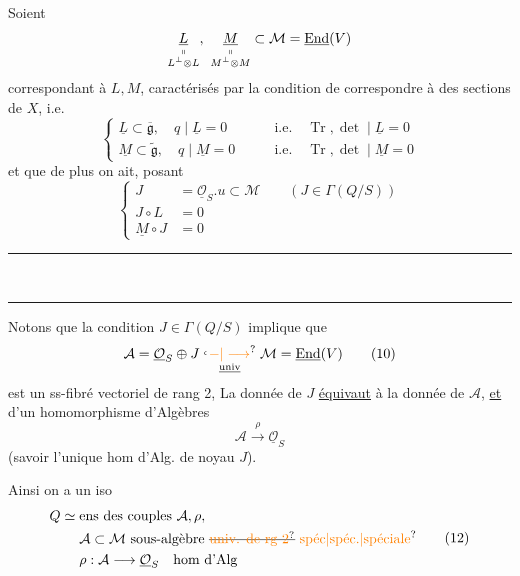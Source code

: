 Soient 
\[
 \underset{\substack{\shortparallel\\ L^\perp\otimes L}}{\underline L},\
 \underset{\substack{\shortparallel\\ M^\perp\otimes M}}{\underline M}
 \subset\mathcal M=\underline{\operatorname{End}}(V)
\]
correspondant à $L,M$,   caractérisés par la condition de correspondre à des sections de $X$, i.e.
\[
 \left\{\begin{aligned}
 \underline L\subset\overline{\mathfrak g},\quad
 q\mid\underline L=0&\qquad\text{i.e.}\quad\operatorname{Tr},\det\mid\underline L=0\\
 \underline M\subset\widetilde{\mathfrak g},\quad
 q\mid\underline M=0&\qquad\text{i.e.}\quad\operatorname{Tr},\det\mid\underline M=0
 \end{aligned}\right.\tag*{(8)}
\]
et que de plus on ait, posant
\[
 \left\{\begin{aligned}
 J&=\underline{\mathcal O}_S.u\subset\mathcal M
 \qquad(J\in\Gamma(Q/S))\\
 J\circ L&=0\\
 \underline M\circ J&=0
 \end{aligned}\right.\tag*{(9)}
\]
\noindent\rule{.10\linewidth}{.3pt}\\[-.8em]\rule{.11\linewidth}{.3pt}

Notons que la condition $J\in\Gamma(Q/S)$ implique que
\[
 \mathcal A=\underline{\mathcal O}_S\oplus J
 \underset{\underline{\text{univ}}}{\lhook\joinrel\unsure{-|\longrightarrow}}
 \mathcal M=\underline{\operatorname{End}}(V)\tag*{(10)}
\]
est un ss-fibré  vectoriel de rang 2,   La donnée de $J$ \uline{équivaut} à la donnée de $\mathcal A$, \uline{et} d'un homomorphisme d'Algèbres
\[
 \mathcal A\xrightarrow{\rho}\underline{\mathcal O}_S\tag*{(11)}
\]
(savoir l'unique hom d'Alg. de noyau $J$).

Ainsi on a un iso
\[
\begin{aligned}
 Q\simeq{}&\text{ens des couples }\mathcal A,\rho,\\
 &\mathcal A\subset\mathcal M\ \text{sous-algèbre }\deleted{\text{\unsure{univ. de rg 2}}}\ \text{\unsure{spéc|spéc.|spéciale}}\\
 &\rho:\mathcal A\longrightarrow\underline{\mathcal O}_S\quad\text{hom d'Alg}
\end{aligned}\tag*{(12)}
\]

